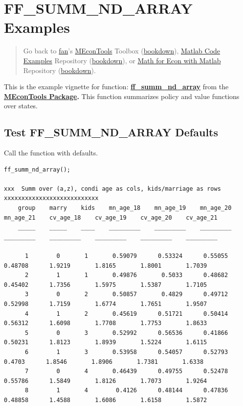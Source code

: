 \documentclass[
]{book}
\begin{document}
\hypertarget{ff_summ_nd_array-examples}{%
\section{FF\_SUMM\_ND\_ARRAY Examples}\label{ff_summ_nd_array-examples}}

\begin{quote}
Go back to \href{http://fanwangecon.github.io/}{fan}'s \href{https://fanwangecon.github.io/MEconTools/}{MEconTools} Toolbox (\href{https://fanwangecon.github.io/MEconTools/bookdown}{bookdown}), \href{https://fanwangecon.github.io/M4Econ/}{Matlab Code Examples} Repository (\href{https://fanwangecon.github.io/M4Econ/bookdown}{bookdown}), or \href{https://fanwangecon.github.io/Math4Econ/}{Math for Econ with Matlab} Repository (\href{https://fanwangecon.github.io/Math4Econ/bookdown}{bookdown}).
\end{quote}

This is the example vignette for function:
\href{https://github.com/FanWangEcon/MEconTools/blob/master/MEconTools/summ/ff_summ_nd_array.m}{\textbf{ff\_summ\_nd\_array}}
from the \href{https://fanwangecon.github.io/MEconTools/}{\textbf{MEconTools
Package}}\textbf{.} This function
summarizes policy and value functions over states.

\hypertarget{test-ff_summ_nd_array-defaults}{%
\subsection{Test FF\_SUMM\_ND\_ARRAY Defaults}\label{test-ff_summ_nd_array-defaults}}

Call the function with defaults.

\begin{verbatim}
ff_summ_nd_array();

xxx  Summ over (a,z), condi age as cols, kids/marriage as rows  xxxxxxxxxxxxxxxxxxxxxxxxxxx
    group    marry    kids    mn_age_18    mn_age_19    mn_age_20    mn_age_21    cv_age_18    cv_age_19    cv_age_20    cv_age_21
    _____    _____    ____    _________    _________    _________    _________    _________    _________    _________    _________

      1        0       1       0.59079      0.53324      0.55055      0.48708      1.9219       1.8165       1.8001       1.7039  
      2        1       1       0.49876       0.5033      0.48682      0.45402      1.7356       1.5975       1.5387       1.7105  
      3        0       2       0.50857       0.4829      0.49712      0.52998      1.7159       1.6774       1.7651       1.9507  
      4        1       2       0.45619      0.51721      0.50414      0.56312      1.6098       1.7708       1.7753       1.8633  
      5        0       3       0.52992      0.56536      0.41866      0.50231      1.8123       1.8939       1.5224       1.6115  
      6        1       3       0.53958      0.54057      0.52793       0.4703      1.8546       1.8906       1.7381       1.6338  
      7        0       4       0.46439      0.49755      0.52478      0.55786      1.5849       1.8126       1.7073       1.9264  
      8        1       4        0.4126      0.48144      0.47836      0.48858      1.4588       1.6086       1.6158       1.5872  
\end{verbatim}
\end{document}
